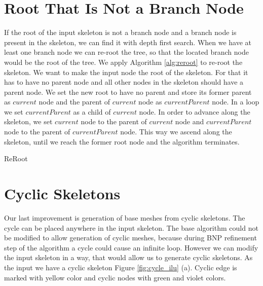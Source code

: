 \section{Root That Is Not a Branch Node}
If the root of the input skeleton is not a branch node and a branch node is present in the skeleton, we can find it with depth first search.
When we have at least one branch node we can re-root the tree, so that the located branch node would be the root of the tree.
We apply Algorithm \ref{alg:reroot} to re-root the skeleton.
We want to make the input node the root of the skeleton.
For that it has to have no parent node and all other nodes in the skeleton should have a parent node.
We set the new root to have no parent and store its former parent as $current$ node and the parent of $current$ node as $currentParent$ node.
In a loop we set $currentParent$ as a child of $current$ node.
In order to advance along the skeleton, we set $current$ node to the parent of $current$ node and $currentParent$ node to the parent of $currentParent$ node.
This way we ascend along the skeleton, until we reach the former root node and the algorithm terminates.
\begin{algorithm}[h]
\caption{ReRoot}
\label{alg:reroot}
\begin{algorithmic}

	\ENDWHILE
\end{algorithmic}
\end{algorithm}

\section{Cyclic Skeletons}
Our last improvement is generation of base meshes from cyclic skeletons.
The cycle can be placed anywhere in the input skeleton.
The base algorithm could not be modified to allow generation of cyclic meshes, because during BNP refinement step of the algorithm a cycle could cause an infinite loop.
However we can modify the input skeleton in a way, that would allow us to generate cyclic skeletons.
As the input we have a cyclic skeleton Figure \ref{fig:cycle_ilu} (a).
Cyclic edge is marked with yellow color and cyclic nodes with green and violet colors.

